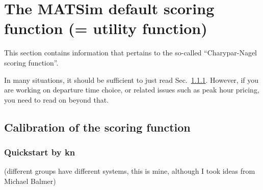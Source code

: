 \chapter{The MATSim default scoring function (= utility function)}


\def\betaperf{\beta_{\it perf}}

\bigskip




This section contains information that pertains to the so-called ``Charypar-Nagel scoring function''.

In many situations, it should be sufficient to just read Sec.~\ref{sec:quickstart-kn}.  However, if you are working on departure time choice, or related issues such as peak hour pricing, you need to read on beyond that.

\section{Calibration of the scoring function}

\subsection{Quickstart by kn}
\label{sec:quickstart-kn}

(different groups have different systems, this is mine, although I took ideas from Michael Balmer)

